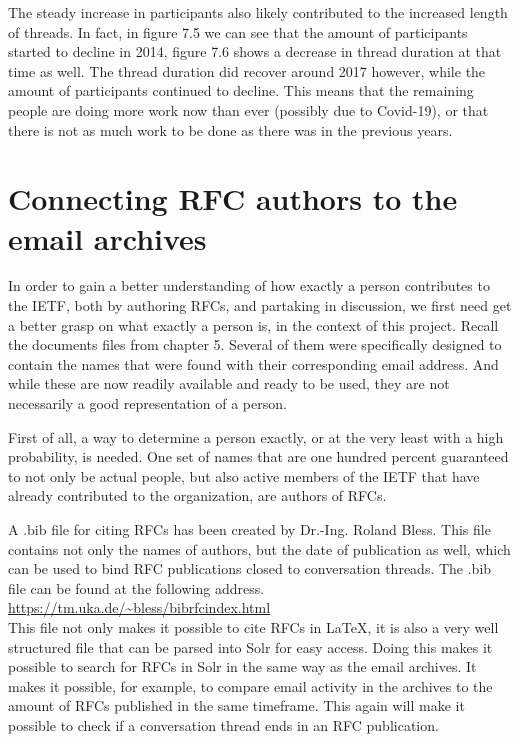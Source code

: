 \documentclass[a4paper,english]{report}
\begin{document}
The steady increase in participants also likely contributed to the increased length of threads.
In fact, in figure 7.5 we can see that the amount of participants started to decline in 2014, figure 7.6 shows a decrease in thread duration at that time as well. The thread duration did recover around 2017 however, while the amount of participants continued to decline. This means that the remaining people are doing more work now than ever (possibly due to Covid-19), or that there is not as much work to be done as there was in the previous years.




\chapter{Connecting RFC authors to the email archives}


In order to gain a better understanding of how exactly a person contributes to the IETF, both by authoring RFCs, and partaking in discussion, we first need get a better grasp on what exactly a person is, in the context of this project. Recall the documents files from chapter 5.
Several of them were specifically designed to contain the names that were found with their corresponding email address. And while these are now readily available and ready to be used, they are not necessarily a good representation of a person.

First of all, a way to determine a person exactly, or at the very least with a high probability, is needed. One set of names that are one hundred percent guaranteed to not only be actual people, but also active members of the IETF that have already contributed to the organization, are authors of RFCs.  

A .bib file for citing RFCs has been created by Dr.-Ing. Roland Bless.
This file contains not only the names of authors, but the date of publication as well, which can be used to bind RFC publications closed to conversation threads.
The .bib file can be found at the following address.\\

\url{https://tm.uka.de/~bless/bibrfcindex.html}\\

This file not only makes it possible to cite RFCs in LaTeX, it is also a very well structured file that can be parsed into Solr for easy access.
Doing this makes it possible to search for RFCs in Solr in the same way as the email archives. It makes it possible, for example, to compare email activity in the archives to the amount of RFCs published in the same timeframe.
This again will make it possible to check if a conversation thread ends in an RFC publication.
\end{document}
